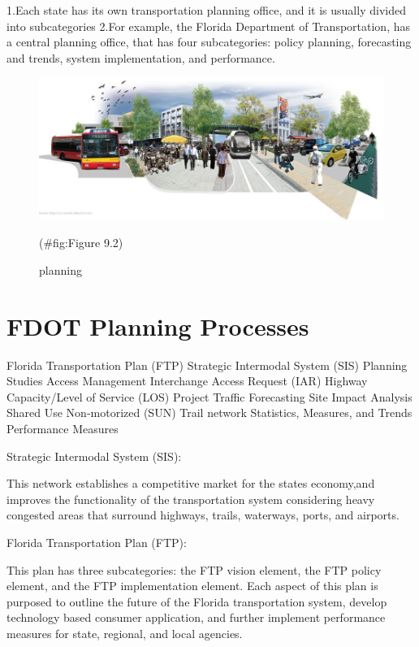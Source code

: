 \documentclass[
]{book}
\begin{document}
1.Each state has its own transportation planning office, and it is usually divided into subcategories
2.For example, the Florida Department of Transportation, has a central planning office, that has four subcategories: policy planning, forecasting and trends, system implementation, and performance.

\begin{figure}

{\centering \includegraphics{./Images/planning design/planning} 

}

\caption{planning}(\#fig:Figure 9.2)
\end{figure}

\hypertarget{planning-process}{%
\section{FDOT Planning Processes}\label{planning-process}}

Florida Transportation Plan (FTP)
Strategic Intermodal System (SIS)
Planning Studies
Access Management
Interchange Access Request (IAR)
Highway Capacity/Level of Service (LOS)
Project Traffic Forecasting
Site Impact Analysis
Shared Use Non-motorized (SUN) Trail network
Statistics, Measures, and Trends
Performance Measures

Strategic Intermodal System (SIS):

This network establishes a competitive market for the states economy,and improves the functionality of the transportation system considering heavy congested areas that surround highways, trails, waterways, ports, and airports.

Florida Transportation Plan (FTP):

This plan has three subcategories: the FTP vision element, the FTP policy element, and the FTP implementation element. Each aspect of this plan is purposed to outline the future of the Florida transportation system, develop technology based consumer application, and further implement performance measures for state, regional, and local agencies.
\end{document}
